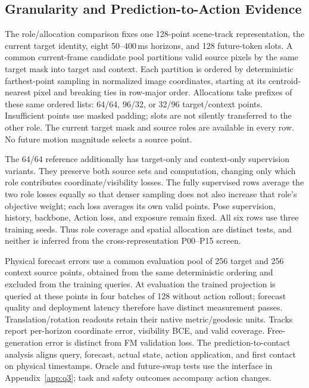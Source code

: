 \subsection{Granularity and Prediction-to-Action Evidence}
The role/allocation comparison fixes one 128-point scene-track representation,
the current target identity, eight 50--400\,ms horizons, and 128 future-token
slots. A common current-frame candidate pool partitions valid source pixels
by the same target mask into target and context. Each partition is ordered
by deterministic farthest-point sampling in normalized image coordinates,
starting at its centroid-nearest pixel and breaking ties in row-major order.
Allocations take prefixes of these same ordered lists: 64/64, 96/32, or
32/96 target/context points. Insufficient points use masked padding; slots
are not silently transferred to the other role. The current target mask
and source roles are available in every row. No future motion magnitude
selects a source point.

The 64/64 reference additionally has target-only and context-only supervision
variants. They preserve both source sets and computation, changing only
which role contributes coordinate/visibility losses. The fully supervised
rows average the two role losses equally so that denser sampling does not
also increase that role's objective weight; each loss averages its own
valid points. Pose supervision, history, backbone, Action loss, and exposure
remain fixed. All six rows use three training seeds. Thus role coverage
and spatial allocation are distinct tests, and neither is inferred from
the cross-representation P00--P15 screen.



Physical forecast errors use a common evaluation pool of 256 target and
256 context source points, obtained from the same deterministic ordering
and excluded from the training queries. At evaluation the trained projection
is queried at these points in four batches of 128 without action rollout;
forecast quality and deployment latency therefore have distinct measurement
passes. Translation/rotation readouts retain their native metric/geodesic
units. Tracks report per-horizon coordinate error, visibility BCE, and valid
coverage. Free-generation error is distinct from FM validation loss.
The prediction-to-contact analysis aligns query, forecast, actual state,
action application, and first contact on physical timestamps. Oracle and
future-swap tests use the interface in Appendix~\ref{app:q3}; task and safety
outcomes accompany action changes.
